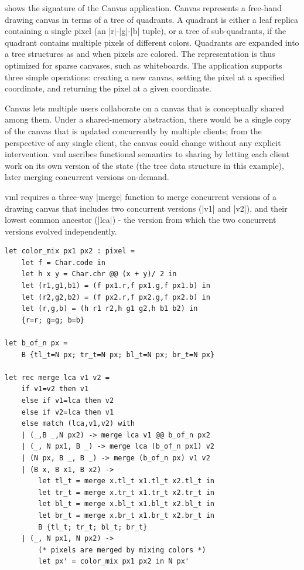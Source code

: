 \documentclass[twocolumn,9pt]{extarticle}
\newcommand{\name}{{\sc vml}\xspace}
\newcommand{\drawsome}{{\sf Canvas}\xspace}
\begin{document}
\noindent shows the signature of the \drawsome application. \drawsome
represents a free-hand drawing canvas in terms of a tree of quadrants.  A
quadrant is either a leaf replica containing a single pixel (an |r|-|g|-|b|
tuple), or a tree of sub-quadrants, if the quadrant contains multiple pixels of
different colors. Quadrants are expanded into a tree structures as and when
pixels are colored.  The representation is thus optimized for sparse canvases,
such as whiteboards. The application supports three simple operations: creating
a new canvas, setting the pixel at a specified coordinate, and returning the
pixel at a given coordinate.

\drawsome lets multiple users collaborate on a canvas that is conceptually
shared among them. Under a shared-memory abstraction, there would be a single
copy of the canvas that is updated concurrently by multiple clients; from the
perspective of any single client, the canvas could change without any explicit
intervention. \name ascribes functional semantics to sharing by letting each
client work on its own version of the state (the tree data structure in this
example), later merging concurrent versions on-demand.

\name requires a three-way |merge| function to merge concurrent versions of a
drawing canvas that includes two concurrent versions (|v1| and |v2|), and
their lowest common ancestor (|lca|) - the version from which the two
concurrent versions evolved independently.

\begin{lstlisting}
let color_mix px1 px2 : pixel =
	let f = Char.code in
	let h x y = Char.chr @@ (x + y)/ 2 in
	let (r1,g1,b1) = (f px1.r,f px1.g,f px1.b) in
	let (r2,g2,b2) = (f px2.r,f px2.g,f px2.b) in
	let (r,g,b) = (h r1 r2,h g1 g2,h b1 b2) in
	{r=r; g=g; b=b}

let b_of_n px =
	B {tl_t=N px; tr_t=N px; bl_t=N px; br_t=N px}

let rec merge lca v1 v2 =
	if v1=v2 then v1
	else if v1=lca then v2
	else if v2=lca then v1
	else match (lca,v1,v2) with
	| (_,B _,N px2) -> merge lca v1 @@ b_of_n px2
	| (_, N px1, B _) -> merge lca (b_of_n px1) v2
	| (N px, B _, B _) -> merge (b_of_n px) v1 v2
	| (B x, B x1, B x2) ->
		let tl_t = merge x.tl_t x1.tl_t x2.tl_t in
		let tr_t = merge x.tr_t x1.tr_t x2.tr_t in
		let bl_t = merge x.bl_t x1.bl_t x2.bl_t in
		let br_t = merge x.br_t x1.br_t x2.br_t in
		B {tl_t; tr_t; bl_t; br_t}
	| (_, N px1, N px2) ->
		(* pixels are merged by mixing colors *)
		let px' = color_mix px1 px2 in N px'
\end{lstlisting}
\end{document}
